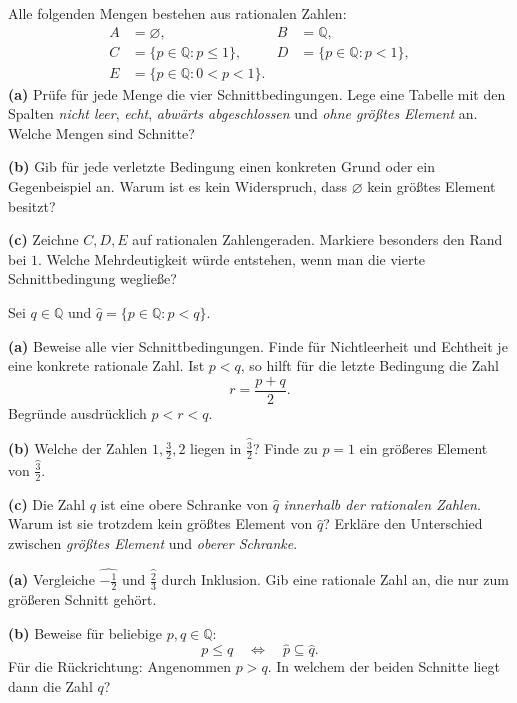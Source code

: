Alle folgenden Mengen bestehen aus rationalen Zahlen:
\[
\begin{aligned}
 A&=\varnothing,& B&=\mathbb Q,\\
 C&=\{p\in\mathbb Q:p\le1\},&
 D&=\{p\in\mathbb Q:p<1\},\\
 E&=\{p\in\mathbb Q:0<p<1\}.&&
\end{aligned}
\]
\textbf{(a)} Prüfe für jede Menge die vier Schnittbedingungen.
Lege eine Tabelle mit den Spalten \emph{nicht leer}, \emph{echt},
\emph{abwärts abgeschlossen} und \emph{ohne größtes Element} an.
Welche Mengen sind Schnitte?

\textbf{(b)} Gib für jede verletzte Bedingung einen konkreten Grund
oder ein Gegenbeispiel an. Warum ist es kein Widerspruch, dass
$\varnothing$ kein größtes Element besitzt?

\textbf{(c)} Zeichne $C,D,E$ auf rationalen Zahlengeraden.
Markiere besonders den Rand bei $1$. Welche Mehrdeutigkeit würde
entstehen, wenn man die vierte Schnittbedingung wegließe?

Sei $q\in\mathbb Q$ und
$\widehat q=\{p\in\mathbb Q:p<q\}$.

\textbf{(a)} Beweise alle vier Schnittbedingungen.
Finde für Nichtleerheit und Echtheit je eine konkrete rationale Zahl.
Ist $p<q$, so hilft für die letzte Bedingung die Zahl
\[
 r=\frac{p+q}{2}.
\]
Begründe ausdrücklich $p<r<q$.

\textbf{(b)} Welche der Zahlen $1,\frac32,2$ liegen in
$\widehat{\frac32}$? Finde zu $p=1$ ein größeres Element
von $\widehat{\frac32}$.

\textbf{(c)} Die Zahl $q$ ist eine obere Schranke von
$\widehat q$ \emph{innerhalb der rationalen Zahlen}.
Warum ist sie trotzdem kein größtes Element von $\widehat q$?
Erkläre den Unterschied zwischen \emph{größtes Element}
und \emph{oberer Schranke}.

\textbf{(a)} Vergleiche
$\widehat{-\frac12}$ und $\widehat{\frac23}$ durch Inklusion.
Gib eine rationale Zahl an, die nur zum größeren Schnitt gehört.

\textbf{(b)} Beweise für beliebige $p,q\in\mathbb Q$:
\[
 p\le q\quad\Longleftrightarrow\quad
 \widehat p\subseteq\widehat q.
\]
Für die Rückrichtung: Angenommen $p>q$.
In welchem der beiden Schnitte liegt dann die Zahl $q$?

